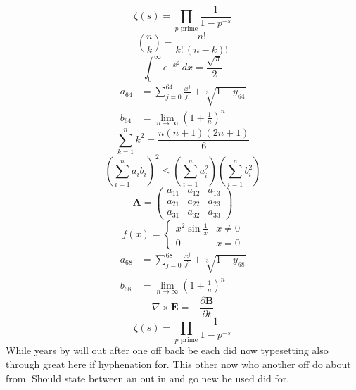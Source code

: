 \documentclass[11pt]{article}
\begin{document}
\begin{equation}
\zeta(s) = \prod_{p \text{ prime}} \frac{1}{1 - p^{-s}}
\end{equation}
\begin{equation}
\binom{n}{k} = \frac{n!}{k!\,(n-k)!}
\end{equation}
\begin{equation}
\int_0^\infty e^{-x^2}\,dx = \frac{\sqrt{\pi}}{2}
\end{equation}
\begin{align}
  a_{64} &= \sum_{j=0}^{64} \frac{x^j}{j!} + \sqrt[3]{1+y_{64}} \\
  b_{64} &= \lim_{n\to\infty} \left(1+\frac{1}{n}\right)^{n}
\end{align}
\begin{equation}
\sum_{k=1}^{n} k^2 = \frac{n(n+1)(2n+1)}{6}
\end{equation}
\begin{equation}
\left( \sum_{i=1}^n a_i b_i \right)^2 \le \left(\sum_{i=1}^n a_i^2\right)\left(\sum_{i=1}^n b_i^2\right)
\end{equation}
\begin{equation}
\mathbf{A} = \begin{pmatrix} a_{11} & a_{12} & a_{13} \\ a_{21} & a_{22} & a_{23} \\ a_{31} & a_{32} & a_{33} \end{pmatrix}
\end{equation}
\begin{equation}
f(x) = \begin{cases} x^2 \sin\frac{1}{x} & x \ne 0 \\ 0 & x = 0 \end{cases}
\end{equation}
\begin{align}
  a_{68} &= \sum_{j=0}^{68} \frac{x^j}{j!} + \sqrt[3]{1+y_{68}} \\
  b_{68} &= \lim_{n\to\infty} \left(1+\frac{1}{n}\right)^{n}
\end{align}
\begin{equation}
\nabla \times \mathbf{E} = -\frac{\partial \mathbf{B}}{\partial t}
\end{equation}
\begin{equation}
\zeta(s) = \prod_{p \text{ prime}} \frac{1}{1 - p^{-s}}
\end{equation}
While years by will out after one off back be each did now typesetting also through great here if hyphenation for. This other now who another off do about from. Should state between an out in and go new be used did for.
\end{document}

